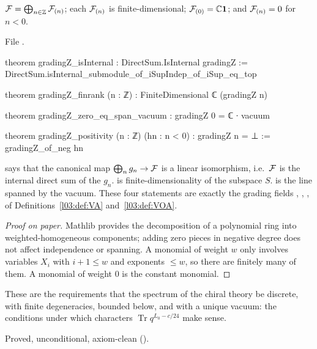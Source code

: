 \begin{theorem}\label{l05:thm:gradingZ}
$\mathcal{F}=\bigoplus_{n\in{\mathbb{Z}}}\mathcal{F}_{(n)}$; each $\mathcal{F}_{(n)}$ is finite-dimensional;
$\mathcal{F}_{(0)}={\mathbb{C}}\mathbf{1}$; and $\mathcal{F}_{(n)}=0$ for $n<0$.
\end{theorem}

\noindent File .
\begin{leancode}
theorem gradingZ_isInternal : DirectSum.IsInternal gradingZ :=
  DirectSum.isInternal_submodule_of_iSupIndep_of_iSup_eq_top

theorem gradingZ_finrank (n : ℤ) : FiniteDimensional ℂ (gradingZ n)

theorem gradingZ_zero_eq_span_vacuum : gradingZ 0 = ℂ ∙ vacuum

theorem gradingZ_positivity (n : ℤ) (hn : n < 0) : gradingZ n = ⊥ := gradingZ_of_neg hn
\end{leancode}

\begin{dictionary}
 says that the canonical map $\bigoplus_n g_n\to\mathcal{F}$ is a linear
isomorphism, i.e.\ $\mathcal{F}$ is the internal direct sum of the $g_n$.  is
finite-dimensionality of the subspace $S$.  is the line spanned by the vacuum. These
four statements are exactly the grading fields , , ,
 of Definitions~\ref{l03:def:VA} and~\ref{l03:def:VOA}.
\end{dictionary}

\begin{proof}[Proof on paper]
Mathlib provides the decomposition of a polynomial ring into weighted-homogeneous components; adding
zero pieces in negative degree does not affect independence or spanning. A monomial of weight $w$ only
involves variables $X_i$ with $i+1\le w$ and exponents $\le w$, so there are finitely many of them. A
monomial of weight $0$ is the constant monomial.
\end{proof}

\begin{physics}
These are the requirements that the spectrum of the chiral theory be discrete, with finite
degeneracies, bounded below, and with a unique vacuum: the conditions under which characters
$\operatorname{Tr}q^{L_0-c/24}$ make sense.
\end{physics}

\begin{status}
Proved, unconditional, axiom-clean ().
\end{status}

